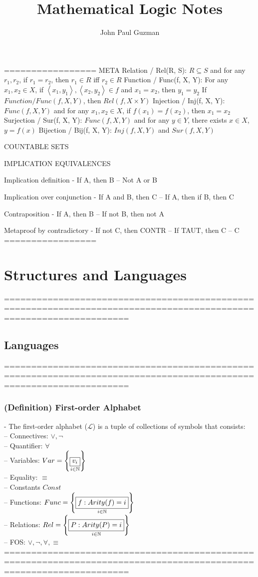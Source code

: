 \documentclass{book}
\title{Mathematical Logic Notes}
\author{John Paul Guzman}
\date{ }
\newcommand{\set}[1]{\left\{ #1 \right\}}
\newcommand{\seq}[1]{\left\langle #1 \right\rangle}
\newcommand{\vdc}[3]{\underset{#2}{\overset{#3}{\fbox{$#1$}}}}
\begin{document}
\maketitle

================= META
Relation / Rel(R, S): $R \subseteq S$ and for any $r_1, r_2$, if $r_1 = r_2$, then $r_1 \in R$ iff $r_2 \in R$ 
Function / Func(f, X, Y): For any $x_1, x_2 \in X$, if $\seq{x_1, y_1}, \seq{x_2, y_2} \in f$ and $x_1 = x_2$, then $y_1 = y_2$
If $Function / Func(f, X, Y)$, then $Rel(f, X \times Y)$
Injection / Inj(f, X, Y): $Func(f, X, Y)$ and for any $x_1, x_2 \in X$, if $f(x_1) = f(x_2)$, then $x_1 = x_2$
Surjection / Sur(f, X, Y): $Func(f, X, Y)$ and for any $y \in Y$, there exists $x \in X$, $y = f(x)$
Bijection / Bij(f, X, Y): $Inj(f, X, Y)$ and $Sur(f, X, Y)$

COUNTABLE SETS

IMPLICATION EQUIVALENCES

Implication definition
	- If A, then B
		-- Not A or B

Implication over conjunction
	- If A and B, then C
		-- If A, then if B, then C

Contraposition
	- If A, then B
		-- If not B, then not A

Metaproof by contradictory
	- If not C, then CONTR
		-- If TAUT, then C
		-- C
=================

\chapter{Structures and Languages}
	===================================================================================================================
\section{Languages}
	===================================================================================================================
\subsection{(Definition) First-order Alphabet} %
	- The first-order alphabet ($\mathcal{L}$) is a tuple of collections of symbols that consists: \\
		-- Connectives: $\lor, \lnot$ \\
		-- Quantifier: $\forall$ \\
		-- Variables: $Var = \set{\vdc{v_i}{i \in \mathbb{N}}{ }}$ \\
		-- Equality: $\equiv$ \\
		-- Constants $Const$ \\
		-- Functions: $Func = \set{\vdc{f: Arity(f) = i}{i \in \mathbb{N}}{ }}$ \\
		-- Relations: $Rel = \set{\vdc{P: Arity(P) = i}{i \in \mathbb{N}}{ }}$ \\
		-- FOS: $\lor, \lnot, \forall, \equiv$ \\
	===================================================================================================================
\end{document}
